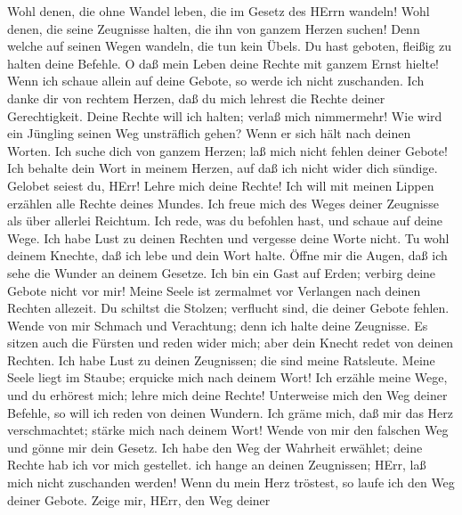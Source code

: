  Wohl denen, die ohne Wandel leben, die im Gesetz des HErrn
wandeln!  Wohl denen, die seine Zeugnisse halten, die ihn
von ganzem Herzen suchen!  Denn welche auf seinen Wegen
wandeln, die tun kein Übels.  Du hast geboten, fleißig zu
halten deine Befehle.  O daß mein Leben deine Rechte mit
ganzem Ernst hielte!  Wenn ich schaue allein auf deine
Gebote, so werde ich nicht zuschanden.  Ich danke dir von
rechtem Herzen, daß du mich lehrest die Rechte deiner Gerechtigkeit.
 Deine Rechte will ich halten; verlaß mich nimmermehr!
 Wie wird ein Jüngling seinen Weg unsträflich gehen? Wenn er
sich hält nach deinen Worten.  Ich suche dich von ganzem
Herzen; laß mich nicht fehlen deiner Gebote!  Ich behalte
dein Wort in meinem Herzen, auf daß ich nicht wider dich sündige.
 Gelobet seiest du, HErr! Lehre mich deine Rechte!
 Ich will mit meinen Lippen erzählen alle Rechte deines
Mundes.  Ich freue mich des Weges deiner Zeugnisse als über
allerlei Reichtum.  Ich rede, was du befohlen hast, und
schaue auf deine Wege.  Ich habe Lust zu deinen Rechten und
vergesse deine Worte nicht.  Tu wohl deinem Knechte, daß
ich lebe und dein Wort halte.  Öffne mir die Augen, daß ich
sehe die Wunder an deinem Gesetze.  Ich bin ein Gast auf
Erden; verbirg deine Gebote nicht vor mir!  Meine Seele ist
zermalmet vor Verlangen nach deinen Rechten allezeit.  Du
schiltst die Stolzen; verflucht sind, die deiner Gebote fehlen.
 Wende von mir Schmach und Verachtung; denn ich halte deine
Zeugnisse.  Es sitzen auch die Fürsten und reden wider
mich; aber dein Knecht redet von deinen Rechten.  Ich habe
Lust zu deinen Zeugnissen; die sind meine Ratsleute.  Meine
Seele liegt im Staube; erquicke mich nach deinem Wort!  Ich
erzähle meine Wege, und du erhörest mich; lehre mich deine Rechte!
 Unterweise mich den Weg deiner Befehle, so will ich reden
von deinen Wundern.  Ich gräme mich, daß mir das Herz
verschmachtet; stärke mich nach deinem Wort!  Wende von mir
den falschen Weg und gönne mir dein Gesetz.  Ich habe den
Weg der Wahrheit erwählet; deine Rechte hab ich vor mich gestellet.
 ich hange an deinen Zeugnissen; HErr, laß mich nicht
zuschanden werden!  Wenn du mein Herz tröstest, so laufe
ich den Weg deiner Gebote.  Zeige mir, HErr, den Weg deiner
